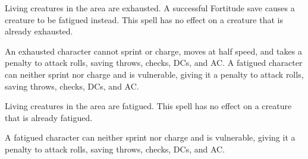 \spelldur{\durshort}
\begin{spelleffect}
  Living creatures in the area are exhausted. A successful Fortitude save causes a creature to be fatigued instead. This spell has no effect on a creature that is already exhausted.
\end{spelleffect}
\begin{spellnotes}
    An exhausted character cannot sprint or charge, moves at half speed, and takes a  penalty to attack rolls, saving throws, checks, DCs, and AC. A fatigued character can neither sprint nor charge and is vulnerable, giving it a  penalty to attack rolls, saving throws, checks, DCs, and AC.
\end{spellnotes}

\spelldur{\durshort}
\begin{spelleffect}
  Living creatures in the area are fatigued. This spell has no effect on a creature that is already fatigued.
\end{spelleffect}
\begin{spellnotes}
    A fatigued character can neither sprint nor charge and is vulnerable, giving it a  penalty to attack rolls, saving throws, checks, DCs, and AC.
\end{spellnotes}

